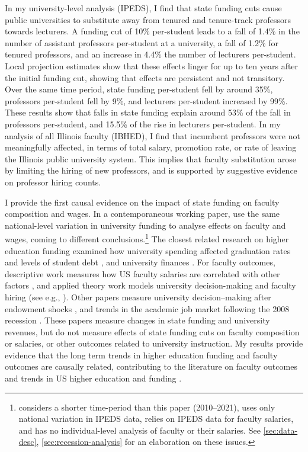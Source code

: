 In my university-level analysis (IPEDS), I find that state funding cuts cause public universities to substitute away from tenured and tenure-track professors towards lecturers.
A funding cut of 10\% per-student leads to a fall of 1.4\% in the number of assistant professors per-student at a university, a fall of 1.2\% for tenured professors, and an increase in 4.4\% the number of lecturers per-student.
Local projection estimates show that these effects linger for up to ten years after the initial funding cut, showing that effects are persistent and not transitory.
Over the same time period, state funding per-student fell by around 35\%, professors per-student fell by 9\%, and lecturers per-student increased by 99\%.
These results show that falls in state funding explain around 53\% of the fall in professors per-student,
and 15.5\% of the rise in lecturers per-student.
In my analysis of all Illinois faculty (IBHED), I find that incumbent professors were not meaningfully affected, in terms of total salary, promotion rate, or rate of leaving the Illinois public university system.
This implies that faculty substitution arose by limiting the hiring of new professors, and is supported by suggestive evidence on professor hiring counts.

I provide the first causal evidence on the impact of state funding on faculty composition and wages.
In a contemporaneous working paper, \cite{hinrichs2022state} use the same national-level variation in university funding to analyse effects on faculty and wages, coming to different conclusions.\footnote{    
    \cite{hinrichs2022state} considers a shorter time-period than this paper (2010--2021), uses only national variation in IPEDS data, relies on IPEDS data for faculty salaries, and has no individual-level analysis of faculty or their salaries.
    See \autoref{sec:data-desc}, \ref{sec:recession-analysis} for an elaboration on these issues.
}
The closest related research on higher education funding examined how university spending affected graduation rates and levels of student debt \citep{NBERw23736,NBERw27885}, and university finances \citep{miller2022making,bound2019public,webber2017state}.
For faculty outcomes, descriptive work measures how US faculty salaries are correlated with other factors \citep{hilmer2020labor}, and applied theory work models university decision-making and faculty hiring (see e.g., \citealt{abe2015implications,johnson2009jep,NBERc13879}).
Other papers measure university decision--making after endowment shocks \citep{brown2014endowment}, and trends in the academic job market following the 2008 recession \citep{turner2014impact}.
These papers measure changes in state funding and university revenues, but do not measure effects of state funding cuts on faculty composition or salaries, or other outcomes related to university instruction.
My results provide evidence that the long term trends in higher education funding and faculty outcomes are causally related, contributing to the literature on faculty outcomes \citep{ehrenberg2003studying} and trends in US higher education and funding \citep{hoxby2009changing,ehrenberg2012american}.

